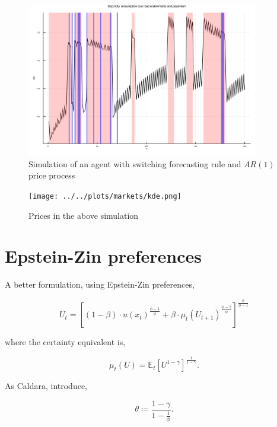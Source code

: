\documentclass[american]{scrartcl}
\newcommand{\E}{\mathbb{E}}
\begin{document}
\begin{figure}[!ht]
	\centering
	\includegraphics[width=0.9\textwidth]{../../plots/markets/simul.png}
	\caption{Simulation of an agent with switching forecasting rule and $AR(1)$ price process}
	\label{fig:sim}
\end{figure}

\begin{figure}[!ht]
	\centering
	\texttt{[image: ../../plots/markets/kde.png]}
	\caption{Prices in the above simulation}
	\label{fig:price}
\end{figure}


\newpage
\appendix

\section{Epstein-Zin preferences}


A better formulation, using Epstein-Zin preferences,

\begin{equation}
	U_t = \left[ (1 - \beta) \cdot u(x_t)^{\frac{\phi - 1}{\phi}} + \beta \cdot \mu_t(U_{t+1})^{\frac{\phi - 1}{\phi}} \right]^{\frac{\phi}{\phi - 1}}
\end{equation}

where the certainty equivalent is,

\begin{equation}
	\mu_t(U) = \E_t\left[ U^{1 - \gamma} \right]^{\frac{1}{1 - \gamma}}.
\end{equation}

As Caldara, introduce,

\begin{equation}
	\theta \coloneqq \frac{1 - \gamma}{1 - \frac{1}{\phi}}.
\end{equation}
\end{document}
